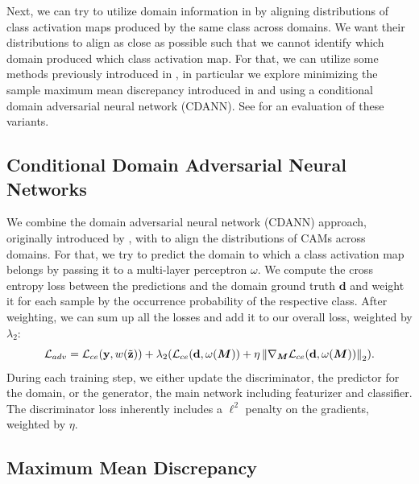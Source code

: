 Next, we can try to utilize domain information in \divcam by aligning distributions of class activation maps produced by the same class across domains. We want their distributions to align as close as possible such that we cannot identify which domain produced which class activation map. For that, we can utilize some methods previously introduced in , in particular we explore minimizing the sample maximum mean discrepancy introduced in  and using a conditional domain adversarial neural network (CDANN). See  for an evaluation of these variants.


\subsection{Conditional Domain Adversarial Neural Networks}
We combine the domain adversarial neural network (CDANN) approach, originally introduced by \citet{LiTGLLZT18}, with \divcam to align the distributions of CAMs across domains. For that, we try to predict the domain to which a class activation map belongs by passing it to a multi-layer perceptron $\omega$. We compute the cross entropy loss between the predictions and the domain ground truth $\mathbf{d}$ and weight it for each sample by the occurrence probability of the respective class.
After weighting, we can sum up all the losses and add it to our overall loss, weighted by $\lambda_2$:
\begin{equation}
\label{eq:adv}
\mathcal{L}_{adv} =\mathcal{L}_{ce}(\mathbf{y}, w(\Tilde{\mathbf{z}}))+\lambda_2 ( \mathcal{L}_{ce}(\mathbf{d}, \omega(\boldsymbol{M})) + \eta \left\|\nabla_{\boldsymbol{M}} \mathcal{L}_{ce}(\mathbf{d}, \omega(\boldsymbol{M}))\right\|_2).
\end{equation}
During each training step, we either update the discriminator, \ie the predictor for the domain, or the generator, \ie the main network including featurizer and classifier. The discriminator loss inherently includes a $\ell^2$ penalty on the gradients, weighted by $\eta$.


\subsection{Maximum Mean Discrepancy}

